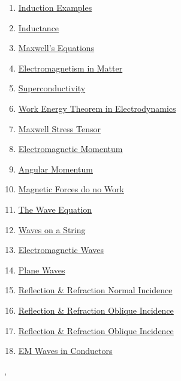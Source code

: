 \documentclass[11pt]{article}
\renewcommand{\today}{\shortmonthname[\the\month] \the \day,  \the\year}
\begin{document}
\begin{multicols}{2}
\begin{enumerate}
		\item \href{https://mp.weixin.qq.com/s/3IzmjB91aI5KEt4cTvvZCg}{Induction Examples}	%
		\item \href{https://mp.weixin.qq.com/s/7NlhPuX4mqzjFEjL2jLuoA}{Inductance}	%
		\item \href{https://mp.weixin.qq.com/s/MCj-rkPOVb1FQ1rPnCwUIg}{Maxwell's Equations}	%
		\item \href{https://mp.weixin.qq.com/s/w36zIpdF_HlIRKFP4ZH6LQ}{Electromagnetism in Matter}	%
		\item \href{https://mp.weixin.qq.com/s/3tavQ6Mi8oLSagBCeu8LxA}{Superconductivity}	%
		\item \href{https://mp.weixin.qq.com/s/tUFV8QgrLxNIcs22JdX7cg}{Work Energy Theorem in Electrodynamics}	%
		\item \href{https://mp.weixin.qq.com/s/NV6QOga1q72n9Epd-xZ-cA}{Maxwell Stress Tensor}	%
		\item \href{https://mp.weixin.qq.com/s/R27Ux_4npt-qyQaRca4WZA}{Electromagnetic Momentum}	%
		\item \href{https://mp.weixin.qq.com/s/VNwak0jo4xu8ynmQwmtCyw}{Angular Momentum}	%
		\item \href{https://mp.weixin.qq.com/s/fnxkmnGC7cLhN_bR-16n4g}{Magnetic Forces do no Work}	%
		\item \href{https://mp.weixin.qq.com/s/QSK5wHQmgt83Cl_C99m43g}{The Wave Equation}	%
		\item \href{https://mp.weixin.qq.com/s/_MQp3eAwYTH6obnqvAFTXg}{Waves on a String}	%
		\item \href{https://mp.weixin.qq.com/s/4g_PgzDn4AgfCAClpmIZLg}{Electromagnetic Waves}	%
		\item \href{https://mp.weixin.qq.com/s/Ve9QD7x-EYOSCR4v9u2AkA}{Plane Waves}	%
		\item \href{https://mp.weixin.qq.com/s/zARyei1kynUq4gHhHKMWVg}{Reflection \& Refraction Normal Incidence}	%
		\item \href{https://mp.weixin.qq.com/s/XgrUZ6QV5GT3yzkcr4oiIw}{Reflection \& Refraction Oblique Incidence}	%
		\item \href{https://mp.weixin.qq.com/s/JpwvCDwkuaOexxXgeVgkHw}{Reflection \& Refraction Oblique Incidence}	%
		\item \href{https://mp.weixin.qq.com/s/noIChIzPUp002PxwoE83XA}{EM Waves in Conductors}	%
	\end{enumerate}
\end{multicols}





%
\begin{flushright}
	\tiny \today 
\end{flushright}
\end{document}
